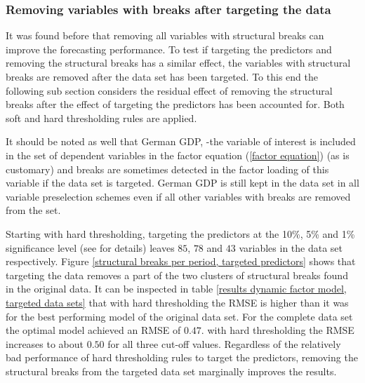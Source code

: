 \documentclass[12pt]{article}
\begin{document}
\subsubsection{Removing variables with breaks after targeting the data}
It was found before that removing all variables with structural breaks can improve the forecasting performance. To test if targeting the predictors and removing the structural breaks has a similar effect, the variables with structural breaks are removed after the data set has been targeted. To this end the following sub section considers the residual effect of removing the structural breaks after the effect of targeting the predictors has been accounted for. Both soft and hard thresholding rules are applied.

It should be noted as well that German GDP, -the variable of interest is included in the set of dependent variables in the factor equation (\ref{factor equation}) (as is customary) and breaks are sometimes detected in the factor loading of this variable if the data set is targeted. German GDP is still kept in the data set in all variable preselection schemes even if all other variables with breaks are removed from the set.

Starting with hard thresholding, targeting the predictors at the 10\%, 5\% and 1\% significance level (see \citet{bai2008forecasting} for details) leaves $85$, $78$ and $43$ variables in the data set respectively. Figure \ref{structural breaks per period, targeted predictors} shows that targeting the data removes a part of the two clusters of structural breaks found in the original data. It can be inspected in table \ref{results dynamic factor model, targeted data sets} that with hard thresholding the RMSE is higher than it was for the best performing model of the original data set. For the complete data set the optimal model achieved an RMSE of $0.47$. with hard thresholding the RMSE increases to about $0.50$ for all three cut-off values. Regardless of the relatively bad performance of hard thresholding rules to target the predictors, removing the structural breaks from the targeted data set marginally improves the results.
\end{document}
